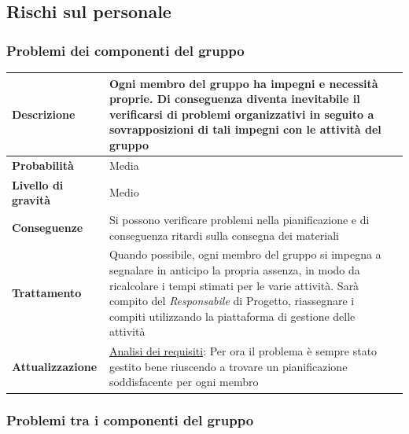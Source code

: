 \subsection{Rischi sul personale}
\subsubsection{Problemi dei componenti del gruppo}

\begin{center}
	
	\begin{tabular}{|>{\centering}m{4cm} ||>{\centering}m{8cm} |>{\centering\arraybackslash}m{0pt}@{}|}
		\hline
		\textbf{Descrizione} & Ogni membro del gruppo ha impegni e necessità proprie. Di conseguenza diventa inevitabile
		il verificarsi di problemi organizzativi in seguito a
		sovrapposizioni di tali impegni con le attività del gruppo & \\[2ex]
		\hline	
		\textbf{Probabilità} & Media &\\[1ex]
		\hline
		\textbf{Livello di gravità} & Medio & \\[1ex]
		\hline
		\textbf{Conseguenze} & Si possono verificare problemi nella pianificazione e di conseguenza ritardi sulla consegna dei materiali & \\[1ex]
		\hline
		\textbf{Trattamento} & Quando possibile, ogni membro del
		gruppo si impegna a segnalare in anticipo la propria assenza, in
		modo da ricalcolare i tempi stimati per le varie attività. Sarà
		compito del  \emph{Responsabile}  di Progetto, riassegnare i compiti
		utilizzando la piattaforma di gestione delle attività & \\[1ex] 
		\hline
		\textbf{Attualizzazione} & \underline{Analisi dei requisiti}: Per ora il problema è sempre stato gestito bene riuscendo a trovare un pianificazione soddisfacente per ogni membro & \\[1ex]
		\hline
	\end{tabular}
	
\end{center}

\newpage
\subsubsection{Problemi tra i componenti del gruppo}

